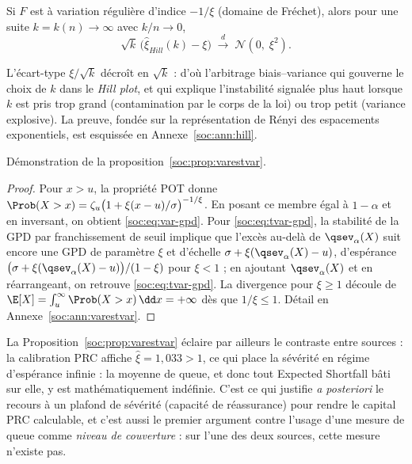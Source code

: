 \begin{proposition}\label{soc:prop:hill}
Si $F$ est à variation régulière d'indice $-1/\xi$ (domaine de Fréchet), alors pour une suite $k=k(n)\to\infty$ avec $k/n\to0$,
\begin{equation}
\sqrt{k}\,\bigl(\hat\xi_{Hill}(k)-\xi\bigr)\;\xrightarrow{\;d\;}\;\mathcal{N}(0,\;\xi^2).
\end{equation}
\end{proposition}

\noindent L'écart-type $\xi/\sqrt{k}$ décroît en $\sqrt{k}$ : d'où l'arbitrage biais--variance qui gouverne le choix de $k$ dans le \emph{Hill plot}, et qui explique l'instabilité signalée plus haut lorsque $k$ est pris trop grand (contamination par le corps de la loi) ou trop petit (variance explosive). La preuve, fondée sur la représentation de Rényi des espacements exponentiels, est esquissée en Annexe~\ref{soc:ann:hill}.

\noindent Démonstration de la proposition~\ref{soc:prop:varestvar}.

\begin{proof}
Pour $x>u$, la propriété POT donne $\Prob(X>x)=\zeta_u\bigl(1+\xi(x-u)/\sigma\bigr)^{-1/\xi}$. En posant ce membre égal à $1-\alpha$ et en inversant, on obtient \eqref{soc:eq:var-gpd}. Pour \eqref{soc:eq:tvar-gpd}, la stabilité de la GPD par franchissement de seuil implique que l'excès au-delà de $\qsev_\alpha(X)$ suit encore une GPD de paramètre $\xi$ et d'échelle $\sigma+\xi(\qsev_\alpha(X)-u)$, d'espérance $\bigl(\sigma+\xi(\qsev_\alpha(X)-u)\bigr)/(1-\xi)$ pour $\xi<1$ ; en ajoutant $\qsev_\alpha(X)$ et en réarrangeant, on retrouve \eqref{soc:eq:tvar-gpd}. La divergence pour $\xi\ge1$ découle de $\E[X]=\int_u^\infty \Prob(X>x)\,\dd x=+\infty$ dès que $1/\xi\le1$. Détail en Annexe~\ref{soc:ann:varestvar}.
\end{proof}

\noindent La Proposition~\ref{soc:prop:varestvar} éclaire par ailleurs le contraste entre sources : la calibration PRC affiche $\hat\xi=1{,}033>1$, ce qui place la sévérité en régime d'espérance infinie : la moyenne de queue, et donc tout Expected Shortfall bâti sur elle, y est mathématiquement indéfinie. C'est ce qui justifie \emph{a posteriori} le recours à un plafond de sévérité (capacité de réassurance) pour rendre le capital PRC calculable, et c'est aussi le premier argument contre l'usage d'une mesure de queue comme \emph{niveau de couverture} : sur l'une des deux sources, cette mesure n'existe pas.

